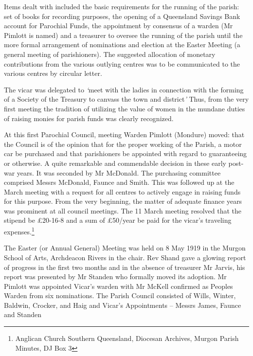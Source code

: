 Items dealt with included the basic requirements for the running of the parish: set of books for recording purposes, the opening of a Queensland Savings Bank account for Parochial Funds, the appointment by consensus of a warden (Mr Pimlott is named) and a treasurer to oversee the running of the parish until the more formal arrangement of nominations and election at the Easter Meeting (a general meeting of parishioners). The suggested allocation of monetary contributions from the various outlying centres was to be communicated to the various centres by circular letter.



The vicar was delegated to \emph{`}meet with the ladies in connection with the forming of a Society of the Treasury to canvass the town and district\emph{'} Thus, from the very first meeting the tradition of utilizing the value of women in the mundane duties of raising monies for parish funds was clearly recognized.



At this first Parochial Council, meeting Warden Pimlott (Mondure) moved: that the Council is of the opinion that for the proper working of the Parish, a motor car be purchased and that parishioners be appointed with regard to guaranteeing or otherwise. A quite remarkable and commendable decision in these early post-war years. It was seconded by Mr McDonald. The purchasing committee comprised Messrs McDonald, Faunce and Smith. This was followed up at the March meeting with a request for all centres to actively engage in raising funds for this purpose. From the very beginning, the matter of adequate finance years was prominent at all council meetings. The 11 March meeting resolved that the stipend be \pounds20-16-8 and a sum of \pounds50/year be paid for the vicar's traveling expenses.\footnote{Anglican Church Southern Queensland, Diocesan Archives, Murgon Parish Minutes, DJ Box 3}


The Easter (or Annual General) Meeting was held on 8 May 1919 in the Murgon School of Arts, Archdeacon Rivers in the chair. Rev Shand gave a glowing report of progress in the first two months and in the absence of treasurer Mr Jarvis, his report was presented by Mr Standen who formally moved its adoption. Mr Pimlott was appointed Vicar's warden with Mr McKell confirmed as Peoples Warden from six nominations. The Parish Council consisted of Wills, Winter, Baldwin, Crocker, and Haig and Vicar's Appointments -- Messrs James, Faunce and Standen



